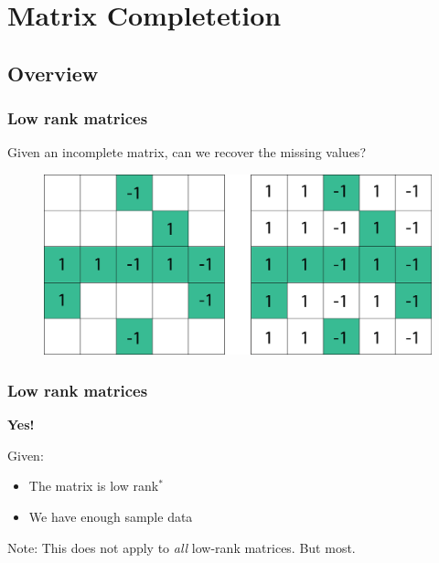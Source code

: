 \documentclass[
	11pt, %
]{beamer}
\begin{document}

\section{Matrix Completetion} %


\subsection{Overview}
%
\begin{frame}
	\frametitle{Low rank matrices}
	\begin{center}
		Given an incomplete matrix, can we recover the missing values?
	\end{center}
	\begin{figure}
		\centering 
		\includegraphics[scale=.3]{assets/mc1.jpg}
	\end{figure}
\end{frame}


\begin{frame}
	\frametitle{Low rank matrices}
	\vspace{-5em}
	\begin{center}
		{\huge \textbf{Yes!}}
	\end{center}	
	\vspace{2em}
	Given:
	\begin{itemize}
		\item The matrix is low rank$^*$
		\item We have enough sample data 
	\end{itemize}

	Note: This does not apply to \emph{all} low-rank matrices. But most.
	\vspace{1em}
\end{frame}
\end{document}
